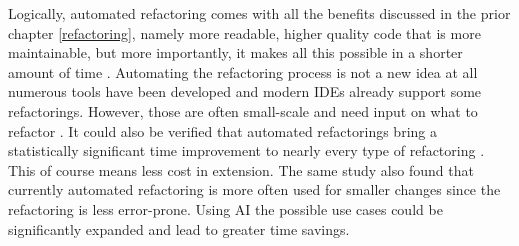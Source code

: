 Logically, automated refactoring comes with all the benefits discussed in the prior chapter \ref{refactoring}, namely more readable, higher quality code that is more maintainable, but more importantly, it makes all this possible in a shorter amount of time \cite{negara2012using}.
Automating the refactoring process is not a new idea at all numerous tools have been developed and modern IDEs already support some refactorings. However, those are often small-scale and need input on what to refactor \cite{usedisuserefactor}.
It could also be verified that automated refactorings bring a statistically significant time improvement to nearly every type of refactoring \cite{negara2013comparative}. This of course means less cost in extension. The same study also found that currently automated refactoring is more often used for smaller changes since the refactoring is less error-prone. 
Using AI the possible use cases could be significantly expanded and lead to greater time savings.